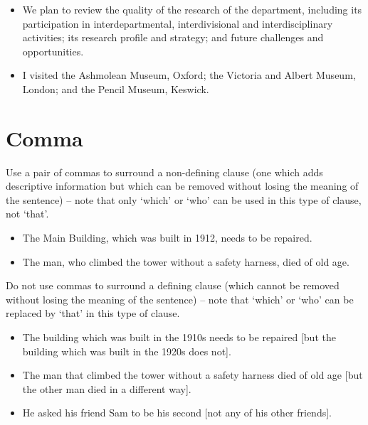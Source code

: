 \documentclass[11pt,a4paper]{book}
\newcommand{\cmark}{{\color{green(html/cssgreen)}\checkmark}}%
\begin{document}
			{\firasans \begin{mdframed}[backgroundcolor=aliceblue] \begin{itemize}[label=\cmark]
				\item We plan to review the quality of the research of the department, including its participation in interdepartmental, interdivisional and interdisciplinary activities; its research profile and strategy; and future challenges and opportunities.
				\item I visited the Ashmolean Museum, Oxford; the Victoria and Albert Museum, London; and the Pencil Museum, Keswick.
			\end{itemize} \end{mdframed} }
		\section{Comma}
		Use a pair of commas to surround a non-defining clause (one which adds descriptive information but which can be removed without losing the meaning of the sentence) -- note that only `which' or `who' can be used in this type of clause, not `that'.
		{\firasans \begin{mdframed}[backgroundcolor=aliceblue] \begin{itemize}[label=\cmark]
			\item The Main Building, which was built in 1912, needs to be repaired.
			\item The man, who climbed the tower without a safety harness, died of old age.
		\end{itemize} \end{mdframed} }
		Do not use commas to surround a defining clause (which cannot be removed without losing the meaning of the sentence) -- note that `which' or `who' can be replaced by `that' in this type of clause.
		{\firasans \begin{mdframed}[backgroundcolor=aliceblue] \begin{itemize}[label=\cmark]
			\item The building which was built in the 1910s needs to be repaired [but the building which was built in the 1920s does not].
			\item The man that climbed the tower without a safety harness died of old age [but the other man died in a different way].
			\item He asked his friend Sam to be his second [not any of his other friends].
		\end{itemize} \end{mdframed} }
\end{document}

